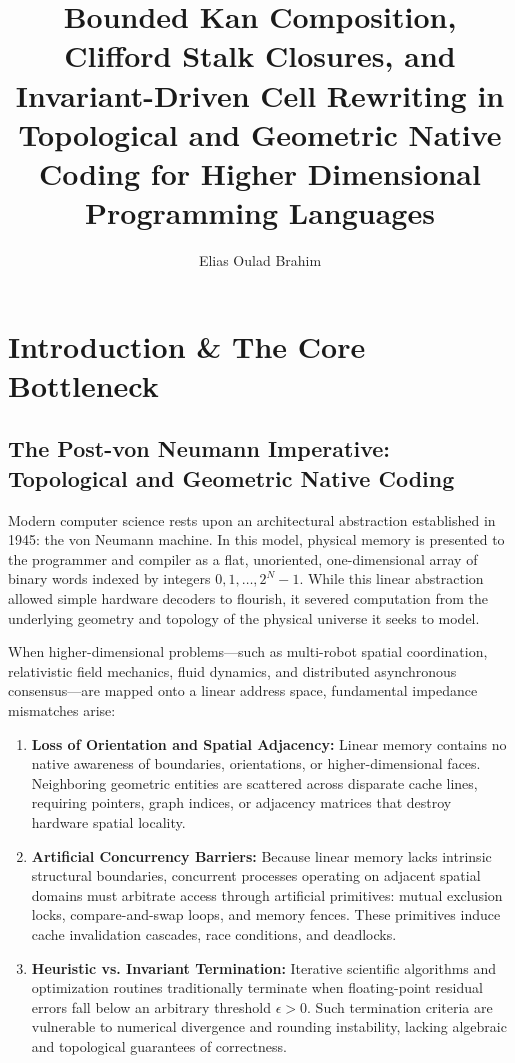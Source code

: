 \documentclass[acmsmall,screen,nonacm]{acmart}
\title[Bounded Kan Composition in Topological and Geometric Native Coding]{Bounded Kan Composition, Clifford Stalk Closures, and Invariant-Driven Cell Rewriting in Topological and Geometric Native Coding for Higher Dimensional Programming Languages}
\author{Elias Oulad Brahim}
\affiliation{%
  \institution{Independent Investigator}
  \city{Barcelona}
  \country{Spain}
}
\begin{document}
\maketitle

\section{Introduction \& The Core Bottleneck}
\label{sec:intro}

\subsection{The Post-von Neumann Imperative: Topological and Geometric Native Coding}
\label{sec:post-von-neumann}

Modern computer science rests upon an architectural abstraction established in 1945: the von Neumann machine. In this model, physical memory is presented to the programmer and compiler as a flat, unoriented, one-dimensional array of binary words indexed by integers $0, 1, \dots, 2^N - 1$. While this linear abstraction allowed simple hardware decoders to flourish, it severed computation from the underlying geometry and topology of the physical universe it seeks to model.

When higher-dimensional problems---such as multi-robot spatial coordination, relativistic field mechanics, fluid dynamics, and distributed asynchronous consensus---are mapped onto a linear address space, fundamental impedance mismatches arise:
\begin{enumerate}
    \item \textbf{Loss of Orientation and Spatial Adjacency:} Linear memory contains no native awareness of boundaries, orientations, or higher-dimensional faces. Neighboring geometric entities are scattered across disparate cache lines, requiring pointers, graph indices, or adjacency matrices that destroy hardware spatial locality.
    \item \textbf{Artificial Concurrency Barriers:} Because linear memory lacks intrinsic structural boundaries, concurrent processes operating on adjacent spatial domains must arbitrate access through artificial primitives: mutual exclusion locks, compare-and-swap loops, and memory fences. These primitives induce cache invalidation cascades, race conditions, and deadlocks.
    \item \textbf{Heuristic vs. Invariant Termination:} Iterative scientific algorithms and optimization routines traditionally terminate when floating-point residual errors fall below an arbitrary threshold $\epsilon > 0$. Such termination criteria are vulnerable to numerical divergence and rounding instability, lacking algebraic and topological guarantees of correctness.
\end{enumerate}
\end{document}
